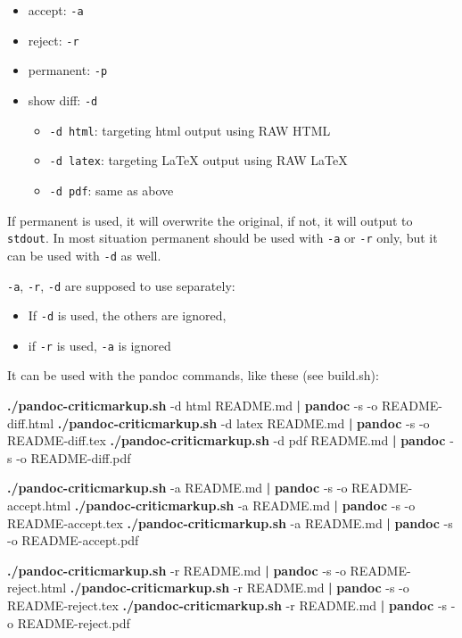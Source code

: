 \documentclass[]{article}
\newenvironment{Shaded}{}{}
\newcommand{\KeywordTok}[1]{\textcolor[rgb]{0.00,0.44,0.13}{\textbf{{#1}}}}
\newcommand{\NormalTok}[1]{{#1}}
\providecommand{\tightlist}{%
  \setlength{\itemsep}{0pt}\setlength{\parskip}{0pt}}
\begin{document}
\begin{itemize}
\tightlist
\item
  accept: \texttt{-a}
\item
  reject: \texttt{-r}
\item
  permanent: \texttt{-p}
\item
  show diff: \texttt{-d}

  \begin{itemize}
  \tightlist
  \item
    \texttt{-d\ html}: targeting html output using RAW HTML
  \item
    \texttt{-d\ latex}: targeting LaTeX output using RAW LaTeX
  \item
    \texttt{-d\ pdf}: same as above
  \end{itemize}
\end{itemize}

If permanent is used, it will overwrite the original, if not, it will
output to \texttt{stdout}. In most situation permanent should be used
with \texttt{-a} or \texttt{-r} only, but it can be used with
\texttt{-d} as well.

\texttt{-a}, \texttt{-r}, \texttt{-d} are supposed to use separately:

\begin{itemize}
\tightlist
\item
  If \texttt{-d} is used, the others are ignored,
\item
  if \texttt{-r} is used, \texttt{-a} is ignored
\end{itemize}

It can be used with the pandoc commands, like these (see build.sh):

\begin{Shaded}
\begin{Highlighting}[]
\KeywordTok{./pandoc-criticmarkup.sh} \NormalTok{-d html README.md }\KeywordTok{|} \KeywordTok{pandoc} \NormalTok{-s -o README-diff.html}
\KeywordTok{./pandoc-criticmarkup.sh} \NormalTok{-d latex README.md }\KeywordTok{|} \KeywordTok{pandoc} \NormalTok{-s -o README-diff.tex}
\KeywordTok{./pandoc-criticmarkup.sh} \NormalTok{-d pdf README.md }\KeywordTok{|} \KeywordTok{pandoc} \NormalTok{-s -o README-diff.pdf}

\KeywordTok{./pandoc-criticmarkup.sh} \NormalTok{-a README.md }\KeywordTok{|} \KeywordTok{pandoc} \NormalTok{-s -o README-accept.html}
\KeywordTok{./pandoc-criticmarkup.sh} \NormalTok{-a README.md }\KeywordTok{|} \KeywordTok{pandoc} \NormalTok{-s -o README-accept.tex}
\KeywordTok{./pandoc-criticmarkup.sh} \NormalTok{-a README.md }\KeywordTok{|} \KeywordTok{pandoc} \NormalTok{-s -o README-accept.pdf}

\KeywordTok{./pandoc-criticmarkup.sh} \NormalTok{-r README.md }\KeywordTok{|} \KeywordTok{pandoc} \NormalTok{-s -o README-reject.html}
\KeywordTok{./pandoc-criticmarkup.sh} \NormalTok{-r README.md }\KeywordTok{|} \KeywordTok{pandoc} \NormalTok{-s -o README-reject.tex}
\KeywordTok{./pandoc-criticmarkup.sh} \NormalTok{-r README.md }\KeywordTok{|} \KeywordTok{pandoc} \NormalTok{-s -o README-reject.pdf  }
\end{Highlighting}
\end{Shaded}
\end{document}
